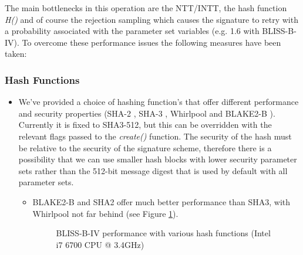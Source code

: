 The main bottlenecks in this operation are the NTT/INTT, the hash function \textit{H()} and of course the rejection sampling which causes the signature to retry with a probability associated with the parameter set variables (e.g. 1.6 with BLISS-B-IV). To overcome these performance issues the following measures have been taken:

\subsubsection{Hash Functions}

\begin{itemize}
\item We've provided a choice of hashing function's that offer different performance and security properties (SHA-2 \cite{sha2_gladman}, SHA-3 \cite{tiny_sha3}, Whirlpool \cite{whirlpool} and BLAKE2-B \cite{blake2}). Currently it is fixed to SHA3-512, but this can be overridden with the relevant flags passed to the \textit{create()} function. The security of the hash must be relative to the security of the signature scheme, therefore there is a possibility that we can use smaller hash blocks with lower security parameter sets rather than the 512-bit message digest that is used by default with all parameter sets.
\begin{itemize}
  \item BLAKE2-B and SHA2 offer much better performance than SHA3, with Whirlpool not far behind (see Figure \ref{fig:bliss_b_hash_comparison}).

\pgfplotsset{compat=1.13,width=14cm,height=12cm}
\begin{figure}[ht!]
\centering
{}
\caption{BLISS-B-IV performance with various hash functions (Intel i7 6700 CPU @ 3.4GHz)}
\label{fig:bliss_b_hash_comparison}
\end{figure}


\end{itemize}
\end{itemize}
